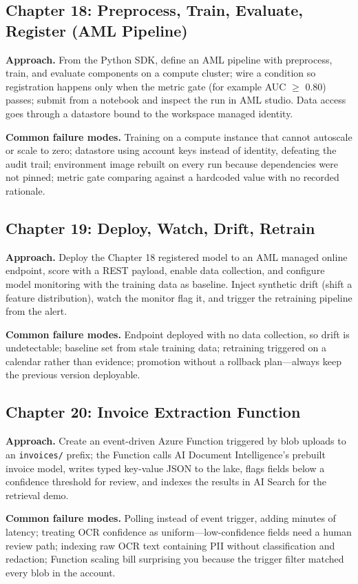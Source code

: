 \subsection*{Chapter 18: Preprocess, Train, Evaluate, Register (AML Pipeline)}
\textbf{Approach.} From the Python SDK, define an AML pipeline with preprocess, train, and
evaluate components on a compute cluster; wire a condition so registration happens only when the
metric gate (for example AUC $\geq$ 0.80) passes; submit from a notebook and inspect the run in
AML studio. Data access goes through a datastore bound to the workspace managed identity.

\textbf{Common failure modes.} Training on a compute instance that cannot autoscale or scale to
zero; datastore using account keys instead of identity, defeating the audit trail; environment
image rebuilt on every run because dependencies were not pinned; metric gate comparing against a
hardcoded value with no recorded rationale.

\subsection*{Chapter 19: Deploy, Watch, Drift, Retrain}
\textbf{Approach.} Deploy the Chapter 18 registered model to an AML managed online endpoint,
score with a REST payload, enable data collection, and configure model monitoring with the
training data as baseline. Inject synthetic drift (shift a feature distribution), watch the
monitor flag it, and trigger the retraining pipeline from the alert.

\textbf{Common failure modes.} Endpoint deployed with no data collection, so drift is
undetectable; baseline set from stale training data; retraining triggered on a calendar rather
than evidence; promotion without a rollback plan---always keep the previous version deployable.

\subsection*{Chapter 20: Invoice Extraction Function}
\textbf{Approach.} Create an event-driven Azure Function triggered by blob uploads to an
\texttt{invoices/} prefix; the Function calls AI Document Intelligence's prebuilt invoice model,
writes typed key-value JSON to the lake, flags fields below a confidence threshold for review,
and indexes the results in AI Search for the retrieval demo.

\textbf{Common failure modes.} Polling instead of event trigger, adding minutes of latency;
treating OCR confidence as uniform---low-confidence fields need a human review path; indexing raw
OCR text containing PII without classification and redaction; Function scaling bill surprising
you because the trigger filter matched every blob in the account.

